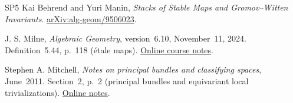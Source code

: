 \documentclass[12pt]{memoir}
\begin{document}
\begin{thebibliography}{SP5}
Kai Behrend and Yuri Manin, \emph{Stacks of Stable Maps and Gromov--Witten Invariants}.
\href{https://arxiv.org/abs/alg-geom/9506023}{arXiv:alg-geom/9506023}.

J. S. Milne, \emph{Algebraic Geometry}, version~6.10, November~11, 2024.
Definition~5.44, p.~118 (\'etale maps).
\href{https://www.jmilne.org/math/CourseNotes/AG.pdf}{Online course notes}.

Stephen A. Mitchell, \emph{Notes on principal bundles and classifying spaces}, June~2011.
Section~2, p.~2 (principal bundles and equivariant local trivializations).
\href{https://sites.math.washington.edu/~mitchell/Notes/prin.pdf}{Online notes}.

\end{thebibliography}
\endgroup
\end{document}
